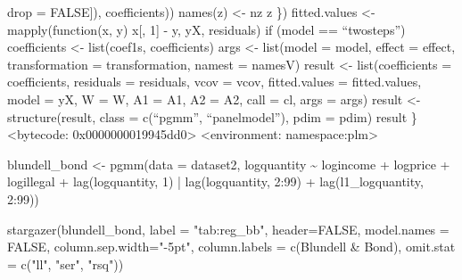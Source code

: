\documentclass[
]{article}
\newenvironment{Shaded}{\begin{snugshade}}{\end{snugshade}}
\newcommand{\AttributeTok}[1]{\textcolor[rgb]{0.77,0.63,0.00}{#1}}
\newcommand{\ConstantTok}[1]{\textcolor[rgb]{0.00,0.00,0.00}{#1}}
\newcommand{\DecValTok}[1]{\textcolor[rgb]{0.00,0.00,0.81}{#1}}
\newcommand{\FunctionTok}[1]{\textcolor[rgb]{0.00,0.00,0.00}{#1}}
\newcommand{\NormalTok}[1]{#1}
\newcommand{\OtherTok}[1]{\textcolor[rgb]{0.56,0.35,0.01}{#1}}
\newcommand{\SpecialCharTok}[1]{\textcolor[rgb]{0.00,0.00,0.00}{#1}}
\newcommand{\StringTok}[1]{\textcolor[rgb]{0.31,0.60,0.02}{#1}}
\let\oldShaded\Shaded
\let\endoldShaded\endShaded
\renewenvironment{Shaded}{\footnotesize\oldShaded}{\endoldShaded}
\begin{document}
drop = FALSE{]}), coefficients)) names(z) \textless- nz z \})
fitted.values \textless- mapply(function(x, y) x{[}, 1{]} - y, yX,
residuals) if (model == ``twosteps'') coefficients \textless-
list(coef1s, coefficients) args \textless- list(model = model, effect =
effect, transformation = transformation, namest = namesV) result
\textless- list(coefficients = coefficients, residuals = residuals, vcov
= vcov, fitted.values = fitted.values, model = yX, W = W, A1 = A1, A2 =
A2, call = cl, args = args) result \textless- structure(result, class =
c(``pgmm'', ``panelmodel''), pdim = pdim) result \} \textless bytecode:
0x0000000019945dd0\textgreater{} \textless environment:
namespace:plm\textgreater{}

\begin{Shaded}
\begin{Highlighting}[]
\NormalTok{blundell\_bond }\OtherTok{\textless{}{-}} \FunctionTok{pgmm}\NormalTok{(}\AttributeTok{data =}\NormalTok{ dataset2,}
\NormalTok{                          logquantity }\SpecialCharTok{\textasciitilde{}}\NormalTok{ logincome }\SpecialCharTok{+}\NormalTok{ logprice }\SpecialCharTok{+} 
\NormalTok{                            logillegal }\SpecialCharTok{+} \FunctionTok{lag}\NormalTok{(logquantity, }\DecValTok{1}\NormalTok{) }\SpecialCharTok{|} 
                            \FunctionTok{lag}\NormalTok{(logquantity, }\DecValTok{2}\SpecialCharTok{:}\DecValTok{99}\NormalTok{) }\SpecialCharTok{+} \FunctionTok{lag}\NormalTok{(l1\_logquantity, }\DecValTok{2}\SpecialCharTok{:}\DecValTok{99}\NormalTok{))}

\FunctionTok{stargazer}\NormalTok{(blundell\_bond, }\AttributeTok{label =} \StringTok{"tab:reg\_bb"}\NormalTok{, }\AttributeTok{header=}\ConstantTok{FALSE}\NormalTok{, }\AttributeTok{model.names =} \ConstantTok{FALSE}\NormalTok{,}
          \AttributeTok{column.sep.width=}\StringTok{"{-}5pt"}\NormalTok{,}
          \AttributeTok{column.labels =} \FunctionTok{c}\NormalTok{(}\StringTok{\textquotesingle{}Blundell \& Bond\textquotesingle{}}\NormalTok{),}
              \AttributeTok{omit.stat =} \FunctionTok{c}\NormalTok{(}\StringTok{"ll"}\NormalTok{, }\StringTok{"ser"}\NormalTok{, }\StringTok{"rsq"}\NormalTok{))}
\end{Highlighting}
\end{Shaded}
\end{document}

